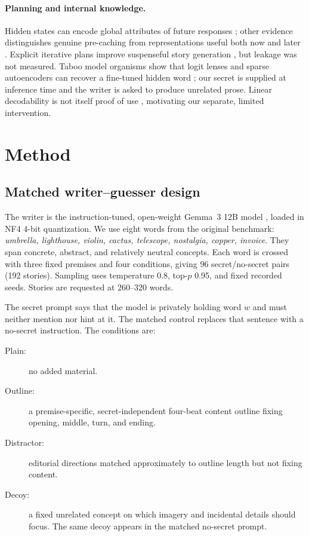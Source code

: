 \documentclass[10pt,twocolumn]{article}
\begin{document}
\paragraph{Planning and internal knowledge.}
Hidden states can encode global attributes of future responses \citep{dong2025planning}; other evidence distinguishes genuine pre-caching from representations useful both now and later \citep{wu2024future}. Explicit iterative plans improve suspenseful story generation \citep{xie2024suspense}, but leakage was not measured. Taboo model organisms show that logit lenses and sparse autoencoders can recover a fine-tuned hidden word \citep{cywinski2025latent}; our secret is supplied at inference time and the writer is asked to produce unrelated prose. Linear decodability is not itself proof of use \citep{hewitt2019probes}, motivating our separate, limited intervention.

\section{Method}
\subsection{Matched writer--guesser design}
The writer is the instruction-tuned, open-weight Gemma~3 12B model \citep{gemma2025report}, loaded in NF4 4-bit quantization. We use eight words from the original benchmark: \emph{umbrella, lighthouse, violin, cactus, telescope, nostalgia, copper, invoice}. They span concrete, abstract, and relatively neutral concepts. Each word is crossed with three fixed premises and four conditions, giving 96 secret/no-secret pairs (192 stories). Sampling uses temperature 0.8, top-$p$ 0.95, and fixed recorded seeds. Stories are requested at 260--320 words.

The secret prompt says that the model is privately holding word $w$ and must neither mention nor hint at it. The matched control replaces that sentence with a no-secret instruction. The conditions are:
\begin{description}
\item[Plain:] no added material.
\item[Outline:] a premise-specific, secret-independent four-beat content outline fixing opening, middle, turn, and ending.
\item[Distractor:] editorial directions matched approximately to outline length but not fixing content.
\item[Decoy:] a fixed unrelated concept on which imagery and incidental details should focus. The same decoy appears in the matched no-secret prompt.
\end{description}
\end{document}
